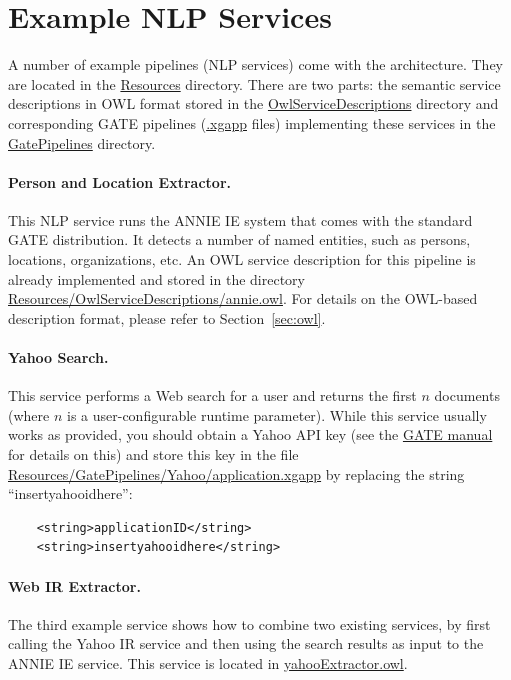 
\section{Example NLP Services}
A number of example pipelines (NLP services) come with the architecture.
They are located in the \url{Resources} directory. There are two
parts: the semantic service descriptions in OWL format stored in the
\url{OwlServiceDescriptions} directory and corresponding GATE
pipelines (\url{.xgapp} files) implementing these services in the
\url{GatePipelines} directory.

\paragraph{Person and Location Extractor.} This NLP service runs the
ANNIE IE system that comes with the standard GATE distribution.  It
detects a number of named entities, such as persons, locations,
organizations, etc.  An OWL service description for this pipeline is
already implemented and stored in the directory
\url{Resources/OwlServiceDescriptions/annie.owl}.  For details on the
OWL-based description format, please refer to Section~\ref{sec:owl}.

\paragraph{Yahoo Search.} This service performs a Web search for a
user and returns the first $n$ documents (where $n$ is a
user-configurable runtime parameter). While this service usually works
as provided, you should obtain a Yahoo API key (see the
\href{http://gate.ac.uk/sale/tao/splitch19.html#x24-51700019.7}{GATE
  manual} for details on this) and store this key in the file
\url{Resources/GatePipelines/Yahoo/application.xgapp} by replacing the
string ``insertyahooidhere'':
\begin{verbatim}
    <string>applicationID</string>
    <string>insertyahooidhere</string>
\end{verbatim}

\paragraph{Web IR Extractor.} The third example service shows how to
combine two existing services, by first calling the Yahoo IR service
and then using the search results as input to the ANNIE IE
service. This service is located in \url{yahooExtractor.owl}.

